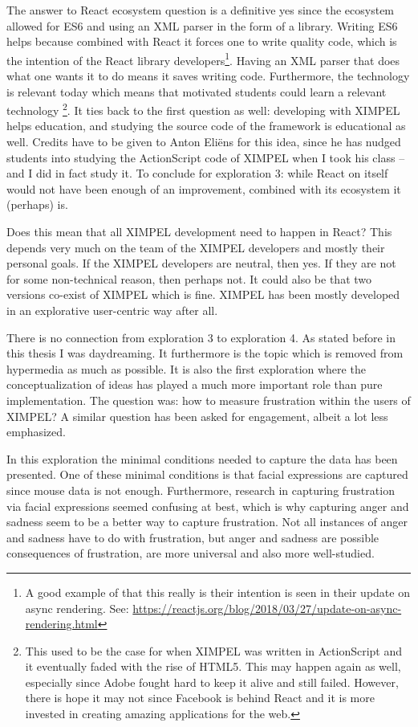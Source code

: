 The answer to React ecosystem question is a definitive yes since the ecosystem allowed for ES6 and using an XML parser in the form of a library. Writing ES6 helps because combined with React it forces one to write quality code, which is the intention of the React library developers\footnote{A good example of that this really is their intention is seen in their update on async rendering. See: \url{https://reactjs.org/blog/2018/03/27/update-on-async-rendering.html}}. Having an XML parser that does what one wants it to do means it saves writing code. Furthermore, the technology is relevant today which means that motivated students could learn a relevant technology
\footnote{This used to be the case for when XIMPEL was written in ActionScript and it eventually faded with the rise of HTML5. This may happen again as well, especially since Adobe fought hard to keep it alive and still failed. However, there is hope it may not since Facebook is behind React and it is more invested in creating amazing applications for the web.}. 
It ties back to the first question as well: developing with XIMPEL helps education, and studying the source code of the framework is educational as well. Credits have to be given to Anton Eli\"ens for this idea, since he has nudged students into studying the ActionScript code of XIMPEL when I took his class -- and I did in fact study it.
To conclude for exploration 3: while React on itself would not have been enough of an improvement, combined with its ecosystem it (perhaps) is.

Does this mean that all XIMPEL development need to happen in React? This depends very much on the team of the XIMPEL developers and mostly their personal goals. If the XIMPEL developers are neutral, then yes. If they are not for some non-technical reason, then perhaps not. It could also be that two versions co-exist of XIMPEL which is fine. XIMPEL has been mostly developed in an explorative user-centric way after all\cite{winoe2018}. 

There is no connection from exploration 3 to exploration 4. As stated before in this thesis I was daydreaming. It furthermore is the topic which is removed from hypermedia as much as possible. It is also the first exploration where the conceptualization of ideas has played a much more important role than pure implementation. The question was: how to measure frustration within the users of XIMPEL? A similar question has been asked for engagement, albeit a lot less emphasized. 

In this exploration the minimal conditions needed to capture the data has been presented. One of these minimal conditions is that facial expressions are captured since mouse data is not enough. Furthermore, research in capturing frustration via facial expressions seemed confusing at best, which is why capturing anger and sadness seem to be a better way to capture frustration. Not all instances of anger and sadness have to do with frustration, but anger and sadness are possible consequences of frustration\cite{funches2011, yamagishi2012, szasz2011, roest2015}, are more universal\cite{ortony1990} and also more well-studied. 

